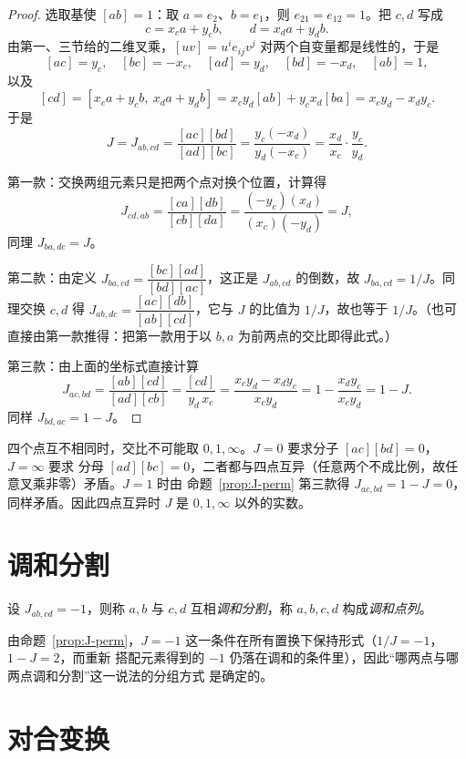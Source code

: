 \begin{proof}
选取基使 $[ab]=1$：取 $a=e_2$、$b=e_1$，则 $e_{21}=e_{12}=1$。把 $c,d$ 写成
\[
c=x_ca+y_cb,\qquad d=x_da+y_db .
\]
由第一、三节给的二维叉乘，$[uv]=u^ie_{ij}v^j$ 对两个自变量都是线性的，于是
\[
[ac]=y_c,\quad [bc]=-x_c,\quad [ad]=y_d,\quad [bd]=-x_d,\quad [ab]=1,
\]
以及
\[
[cd]=[x_ca+y_cb,\ x_da+y_db]=x_cy_d[a b]+y_cx_d[b a]=x_cy_d-x_dy_c .
\]
于是
\[
J=J_{ab,cd}=\frac{[ac][bd]}{[ad][bc]}=\frac{y_c(-x_d)}{y_d(-x_c)}=\frac{x_d}{x_c}\cdot\frac{y_c}{y_d}.
\]

第一款：交换两组元素只是把两个点对换个位置，计算得
\[
J_{cd,ab}=\frac{[ca][db]}{[cb][da]}=\frac{(-y_c)(x_d)}{(x_c)(-y_d)}=J,
\]
同理 $J_{ba,dc}=J$。

第二款：由定义 $J_{ba,cd}=\dfrac{[bc][ad]}{[bd][ac]}$，这正是 $J_{ab,cd}$ 的倒数，故
$J_{ba,cd}=1/J$。同理交换 $c,d$ 得 $J_{ab,dc}=\dfrac{[ac][db]}{[ab][cd]}$，它与 $J$ 的比值为
$1/J$，故也等于 $1/J$。（也可直接由第一款推得：把第一款用于以 $b,a$ 为前两点的交比即得此式。）

第三款：由上面的坐标式直接计算
\[
J_{ac,bd}=\frac{[ab][cd]}{[ad][cb]}=\frac{[cd]}{y_d\,x_c}
=\frac{x_cy_d-x_dy_c}{x_cy_d}=1-\frac{x_dy_c}{x_cy_d}=1-J .
\]
同样 $J_{bd,ac}=1-J$。
\end{proof}

\begin{remark}\label{rem:J-not-1}
四个点互不相同时，交比不可能取 $0,1,\infty$。$J=0$ 要求分子 $[ac][bd]=0$，$J=\infty$ 要求
分母 $[ad][bc]=0$，二者都与四点互异（任意两个不成比例，故任意叉乘非零）矛盾。$J=1$ 时由
命题~\ref{prop:J-perm} 第三款得 $J_{ac,bd}=1-J=0$，同样矛盾。因此四点互异时 $J$ 是
$0,1,\infty$ 以外的实数。
\end{remark}

\section{调和分割}

\begin{definition}[调和分割]
设 $J_{ab,cd}=-1$，则称 $a,b$ 与 $c,d$ 互相\emph{调和分割}，称 $a,b,c,d$ 构成\emph{调和点列}。
\end{definition}

由命题~\ref{prop:J-perm}，$J=-1$ 这一条件在所有置换下保持形式（$1/J=-1$，$1-J=2$，而重新
搭配元素得到的 $-1$ 仍落在调和的条件里），因此“哪两点与哪两点调和分割”这一说法的分组方式
是确定的。

\section{对合变换}

